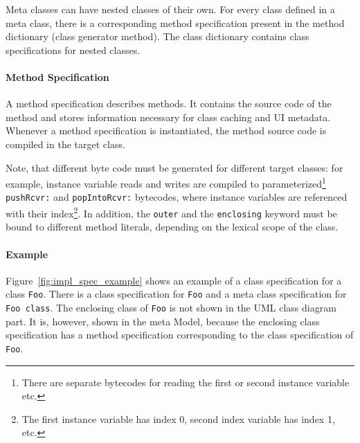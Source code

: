 Meta classes can have nested classes of their own. For every class defined in a meta class, there is a corresponding method specification present in the method dictionary (class generator method). The class dictionary contains class specifications for nested classes.

\paragraph{Method Specification}
A method specification describes methods. It contains the source code of the method and stores information necessary for class caching and UI metadata. Whenever a method specification is instantiated, the method source code is compiled in the target class. 

Note, that different byte code must be generated for different target classes: for example, instance variable reads and writes are compiled to parameterized\footnote{There are separate bytecodes for reading the first or second instance variable etc.} \texttt{pushRcvr:} and \texttt{popIntoRcvr:} bytecodes, where instance variables are referenced with their index\footnote{The first instance variable has index 0, second index variable has index 1, etc.}. In addition, the \texttt{outer} and the \texttt{enclosing} keyword must be bound to different method literals, depending on the lexical scope of the class.

\paragraph{Example}
Figure~\ref{fig:impl_spec_example} shows an example of a class specification for a class \texttt{Foo}. There is a class specification for \texttt{Foo} and a meta class specification for \texttt{Foo class}. The enclosing class of \texttt{Foo} is not shown in the UML class diagram part. It is, however, shown in the meta Model, because the enclosing class specification has a method specification corresponding to the class specification of \texttt{Foo}.


